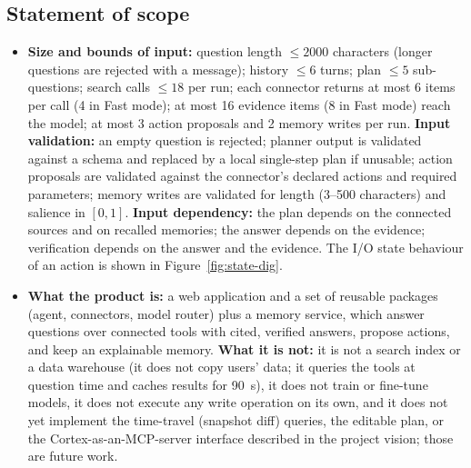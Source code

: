  \subsection{Statement of scope}
	\begin{itemize}
	\item	\textbf{Size and bounds of input:} question length $\le 2000$ characters (longer questions are rejected with a message); history $\le 6$ turns; plan $\le 5$ sub-questions; search calls $\le 18$ per run; each connector returns at most 6 items per call (4 in Fast mode); at most 16 evidence items (8 in Fast mode) reach the model; at most 3 action proposals and 2 memory writes per run. \textbf{Input validation:} an empty question is rejected; planner output is validated against a schema and replaced by a local single-step plan if unusable; action proposals are validated against the connector's declared actions and required parameters; memory writes are validated for length (3--500 characters) and salience in $[0,1]$. \textbf{Input dependency:} the plan depends on the connected sources and on recalled memories; the answer depends on the evidence; verification depends on the answer and the evidence. The I/O state behaviour of an action is shown in Figure~\ref{fig:state-dig}.
	\item \textbf{What the product is:} a web application and a set of reusable packages (agent, connectors, model router) plus a memory service, which answer questions over connected tools with cited, verified answers, propose actions, and keep an explainable memory. \textbf{What it is not:} it is not a search index or a data warehouse (it does not copy users' data; it queries the tools at question time and caches results for 90~s), it does not train or fine-tune models, it does not execute any write operation on its own, and it does not yet implement the time-travel (snapshot diff) queries, the editable plan, or the Cortex-as-an-MCP-server interface described in the project vision; those are future work.
	\end{itemize}


